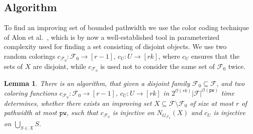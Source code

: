 \documentclass[11pt]{article}
\newtheorem{lemma}[theorem]{Lemma}
\theoremstyle{definition}
\newcommand{\cF}{{\mathcal{F}}}
\newcommand{\pw}{\ensuremath{\mathtt{pw}}\xspace}
\newcommand{\Oh}{\ensuremath{\mathcal{O}}}
\begin{document}
\subsection{Algorithm}
\label{ssec:algorithm}

To find an improving set of bounded pathwidth we use
the color coding technique of Alon et al.~\cite{color-coding},
which is by now a well-established tool in parameterized complexity
used for finding a set consisting of disjoint objects.
We use two random colorings $c_{\cF_0} : \cF_0 \to [r-1]$, $c_U : U \to [rk]$,
where $c_U$ ensures that the sets of $X$ are disjoint,
while $c_{\cF_0}$ is used not to consider the same set of $\cF_0$ twice.

\begin{lemma}
\label{lem:search}
There is an algorithm, that given a disjoint family $\cF_0 \subseteq \cF$,
and two coloring functions $c_{\cF_0} : \cF_0 \to [r-1]$, $c_U : U \to [rk]$
in $2^{\Oh(rk)}|\cF|^{\Oh(\pw)}$ time determines, whether there exists an improving 
set $X \subseteq \cF \setminus \cF_0$ of size at most $r$
of pathwidth at most $\pw$, such that $c_{\cF_0}$ is injective on $N_{G_{\cF_0}}(X)$ 
and $c_U$ is injective on $\bigcup_{S \in X} S$.
\end{lemma}
\end{document}

